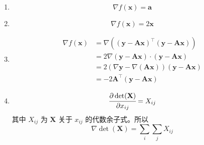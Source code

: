 \documentclass[11pt,letter,notitlepage]{article}
\begin{document}
\begin{solution}
    \begin{enumerate}
        \item $$\nabla f(\mathbf{x}) = \mathbf{a}$$
        \item $$\nabla f(\mathbf{x}) = 2\mathbf{x}$$
        \item $$\begin{aligned}
                      \nabla f(\mathbf{x})
                       & = \nabla \left( (\mathbf{y}-\mathbf{A}\mathbf{x})^\top(\mathbf{y}-\mathbf{A}\mathbf{x}) \right)      \\
                       & = 2\nabla (\mathbf{y}-\mathbf{A}\mathbf{x}) \cdot (\mathbf{y}-\mathbf{A}\mathbf{x})                  \\
                       & = 2\left( \nabla \mathbf{y}- \nabla (\mathbf{A}\mathbf{x}) \right) (\mathbf{y}-\mathbf{A}\mathbf{x}) \\
                       & = -2 \mathbf{A}^\top (\mathbf{y}-\mathbf{A}\mathbf{x})
                  \end{aligned}$$
        \item $$\cfrac{\partial \det(\mathbf{X})}{\partial x_{ij}}=X_{ij}$$
              其中 $X_{ij}$ 为 $\mathbf{X}$ 关于 $x_{ij}$ 的代数余子式。所以
              $$\nabla \det(\mathbf{X})=\sum_i \sum_j X_{ij}$$
    \end{enumerate}
\end{solution}


\newpage
\end{document}
